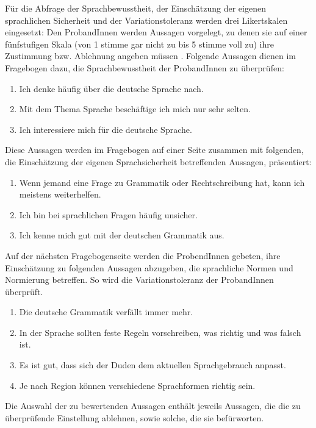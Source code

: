 Für die Abfrage der Sprachbewusstheit, der Einschätzung der eigenen sprachlichen Sicherheit und der Variationstoleranz werden drei Likertskalen eingesetzt: Den ProbandInnen werden Aussagen vorgelegt, zu denen sie auf einer fünfstufigen Skala (von 1 \glqq stimme gar nicht zu \grqq{} bis 5 \glqq stimme voll zu\grqq) ihre Zustimmung bzw. Ablehnung angeben müssen \citep[s.][62]{Rasinger2010}. 
Folgende Aussagen dienen im Fragebogen dazu, die Sprachbewusstheit der ProbandInnen zu überprüfen: 
\begin{enumerate}
\item Ich denke häufig über die deutsche Sprache nach.
\item Mit dem Thema Sprache beschäftige ich mich nur sehr selten.
\item Ich interessiere mich für die deutsche Sprache. 
\end{enumerate}
Diese Aussagen werden im Fragebogen auf einer Seite zusammen mit folgenden, die Einschätzung der eigenen Sprachsicherheit betreffenden Aussagen, präsentiert: 
\begin{enumerate}
\item Wenn jemand eine Frage zu Grammatik oder Rechtschreibung hat, kann ich meistens weiterhelfen.
\item Ich bin bei sprachlichen Fragen häufig unsicher. 
\item Ich kenne mich gut mit der deutschen Grammatik aus.
\end{enumerate}
Auf der nächsten Fragebogenseite werden die ProbendInnen gebeten, ihre Einschätzung zu folgenden Aussagen abzugeben, die sprachliche Normen und Normierung betreffen. 
So wird die Variationstoleranz der ProbandInnen überprüft. 
\begin{enumerate}
\item Die deutsche Grammatik verfällt immer mehr. 
\item In der Sprache sollten feste Regeln vorschreiben, was richtig und was falsch ist. 
\item Es ist gut, dass sich der Duden dem aktuellen Sprachgebrauch anpasst. 
\item Je nach Region können verschiedene Sprachformen richtig sein. 
\end{enumerate}
Die Auswahl der zu bewertenden Aussagen enthält jeweils Aussagen, die die zu überprüfende Einstellung ablehnen, sowie solche, die sie befürworten. 

